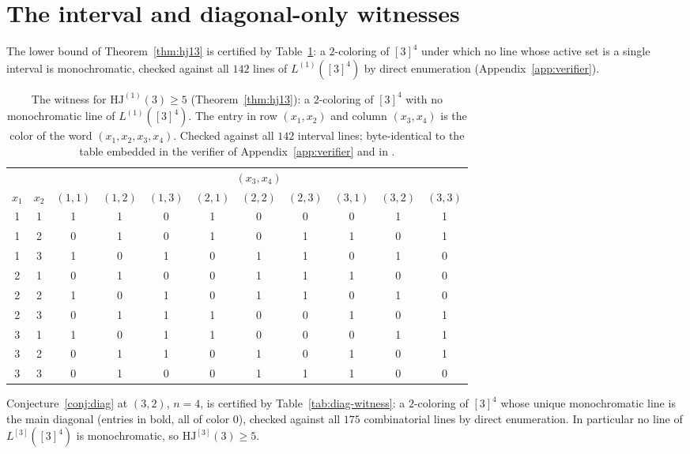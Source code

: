 \documentclass[12pt]{article}
\newcommand{\HJ}{\mathrm{HJ}}
\newcommand{\Ls}{L}
\begin{document}
\section{The interval and diagonal-only witnesses}\label{app:witnesses}

The lower bound of Theorem~\ref{thm:hj13} is certified by
Table~\ref{tab:interval-witness}: a $2$-coloring of $[3]^{4}$ under
which no line whose active set is a single interval is monochromatic,
checked against all $142$ lines of $\Ls^{(1)}([3]^{4})$ by direct
enumeration (Appendix~\ref{app:verifier}).

\begin{table}[ht]
\centering
\caption{The witness for $\HJ^{(1)}(3)\ge 5$ (Theorem~\ref{thm:hj13}):
a $2$-coloring of $[3]^{4}$ with no monochromatic line of
$\Ls^{(1)}([3]^{4})$. The entry in row $(x_{1},x_{2})$ and column
$(x_{3},x_{4})$ is the color of the word $(x_{1},x_{2},x_{3},x_{4})$.
Checked against all $142$ interval lines; byte-identical to the table
embedded in the verifier of Appendix~\ref{app:verifier} and in
\cite{hjcerts}.}
\label{tab:interval-witness}
\begin{tabular}{@{}ccccccccccc@{}}
\toprule
& & \multicolumn{9}{c}{$(x_{3},x_{4})$}\\
\cmidrule(l){3-11}
$x_{1}$ & $x_{2}$ & $(1,1)$ & $(1,2)$ & $(1,3)$ & $(2,1)$ & $(2,2)$ & $(2,3)$ & $(3,1)$ & $(3,2)$ & $(3,3)$\\
\midrule
1 & 1 & 1 & 1 & 0 & 1 & 0 & 0 & 0 & 1 & 1\\
1 & 2 & 0 & 1 & 0 & 1 & 0 & 1 & 1 & 0 & 1\\
1 & 3 & 1 & 0 & 1 & 0 & 1 & 1 & 0 & 1 & 0\\
2 & 1 & 0 & 1 & 0 & 0 & 1 & 1 & 1 & 0 & 0\\
2 & 2 & 1 & 0 & 1 & 0 & 1 & 1 & 0 & 1 & 0\\
2 & 3 & 0 & 1 & 1 & 1 & 0 & 0 & 1 & 0 & 1\\
3 & 1 & 1 & 0 & 1 & 1 & 0 & 0 & 0 & 1 & 1\\
3 & 2 & 0 & 1 & 1 & 0 & 1 & 0 & 1 & 0 & 1\\
3 & 3 & 0 & 1 & 0 & 0 & 1 & 1 & 1 & 0 & 0\\
\bottomrule
\end{tabular}
\end{table}

Conjecture~\ref{conj:diag} at $(3,2)$, $n=4$, is certified by
Table~\ref{tab:diag-witness}: a $2$-coloring of $[3]^{4}$ whose unique
monochromatic line is the main diagonal (entries in bold, all of color
$0$), checked against all $175$ combinatorial lines by direct
enumeration. In particular no line of $\Ls^{[3]}([3]^{4})$ is
monochromatic, so $\HJ^{[3]}(3)\ge 5$.
\end{document}
